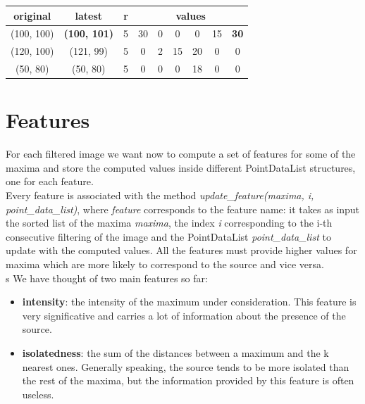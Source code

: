 \documentclass[a4paper,12pt,oneside]{book}
\begin{document}
\begin{onehalfspace}
\begin{table}[!htbp]
            \begin{tabular}{*9c}
            \toprule
           \textbf{original} & \textbf{latest} & \textbf{r} &  \multicolumn{6}{c}{\textbf{values}}\\
            \midrule
            (100, 100) & \textbf{(100, 101)} & 5 & 30 & 0 & 0 & 0 & 15 & \textbf{30}\\
            (120, 100) & (121, 99) & 5  & 0  & 2 & 15 & 20 & 0 & 0\\
            (50, 80) & (50, 80) & 5 & 0 & 0 & 0 & 18 & 0 & 0\\
            \bottomrule
            \end{tabular}
        \end{table} 
        
	\section{Features}
	For each filtered image we want now to compute a set of features for some of the maxima and store the computed values inside different PointDataList structures, one for each feature. \\
	Every feature is associated with the method \textit{update\_feature(maxima, i, point\_data\_list)}, where \textit{feature} corresponds to the feature name: it takes
	as input the sorted list of the maxima \textit{maxima}, the index \textit{i} corresponding to the i-th consecutive filtering of the image and the PointDataList \textit{point\_data\_list} to update with the computed values.
	All the features must provide higher values for maxima which are more likely to correspond to the source	and vice versa. \\s
	We have thought of two main features so far:
	\begin{itemize}
	    \setlength\itemsep{0em}
	    \item \textbf{intensity}: the intensity of the maximum under consideration. This feature is very significative and carries a lot of information about the presence of the source.
	    \item \textbf{isolatedness}: the sum of the distances between a maximum and the k nearest ones. Generally speaking, the source tends to be more isolated than the rest of the maxima, but the information provided by this feature is often useless.
	\end{itemize}
	
	\newpage
	

\end{onehalfspace}
\end{document}
